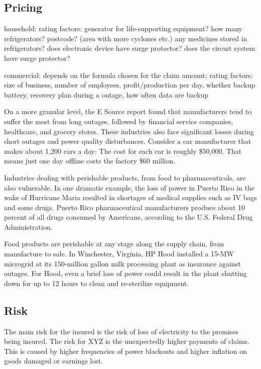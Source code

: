 \documentclass[12pt]{article}
\begin{document}
\subsection{Pricing}
\begin{flushleft}
household: rating factors: generator for life-supporting equipment? how many refrigerators? postcode? (area with more cyclones etc.) any medicines stored in refrigerators? does electronic device have surge protector? does the circuit system have surge protector?\par
commercial: depends on the formula chosen for the claim amount; rating factors: size of business, number of employees, profit/production per day, whether backup battery, recovery plan during a outage, how often data are backup\par
On a more granular level, the E Source report found that manufacturers tend to suffer the most from long outages, followed by financial service companies, healthcare, and grocery stores. These industries also face significant losses during short outages and power quality disturbances. Consider a car manufacturer that makes about 1,200 cars a day: The cost for each car is roughly \$50,000. That means just one day offline costs the factory \$60 million.\par
Industries dealing with perishable products, from food to pharmaceuticals, are also vulnerable. In one dramatic example, the loss of power in Puerto Rico in the wake of Hurricane Maria resulted in shortages of medical supplies such as IV bags and some drugs. Puerto Rico pharmaceutical manufacturers produce about 10 percent of all drugs consumed by Americans, according to the U.S. Federal Drug Administration.\par
Food products are perishable at any stage along the supply chain, from manufacture to sale. In Winchester, Virginia, HP Hood installed a 15-MW microgrid at its 150-million gallon milk processing plant as insurance against outages. For Hood, even a brief loss of power could result in the plant shutting down for up to 12 hours to clean and re-sterilize equipment.\par
\end{flushleft}

\subsection{Risk}
\begin{flushleft}
The main risk for the insured is the risk of loss of electricity to the premises being
insured.
The risk for XYZ is the unexpectedly higher payments of claims.
This is caused by higher frequencies of power blackouts and higher inflation on goods
damaged or earnings lost.
\end{flushleft}
\end{document}
